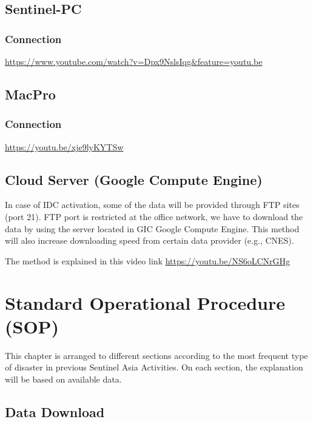 \documentclass[]{book}
\theoremstyle{definition}
\theoremstyle{definition}
\theoremstyle{definition}
\theoremstyle{remark}
\begin{document}
\section{Sentinel-PC}\label{sentinel-pc}

\subsection{Connection}\label{connection-1}

\url{https://www.youtube.com/watch?v=Dpx9NslsIqg\&feature=youtu.be}

\section{MacPro}\label{macpro}

\subsection{Connection}\label{connection-2}

\url{https://youtu.be/xje9lyKYTSw}

\section{Cloud Server (Google Compute
Engine)}\label{cloud-server-google-compute-engine}

In case of IDC activation, some of the data will be provided through FTP
sites (port 21). FTP port is restricted at the office network, we have
to download the data by using the server located in GIC Google Compute
Engine. This method will also increase downloading speed from certain
data provider (e.g., CNES).

The method is explained in this video link
\url{https://youtu.be/NS6oLCNrGHg}

\chapter{Standard Operational Procedure
(SOP)}\label{standard-operational-procedure-sop}

This chapter is arranged to different sections according to the most
frequent type of disaster in previous Sentinel Asia Activities. On each
section, the explanation will be based on available data.

\section{Data Download}\label{data-download}
\end{document}
